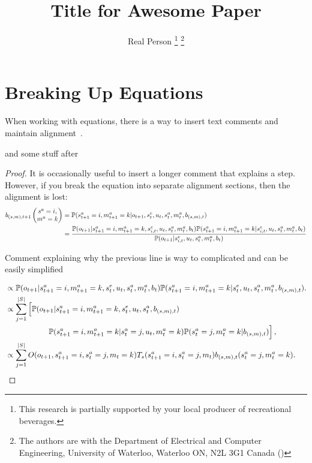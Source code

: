 \documentclass{article}
\title{\LARGE \bf
Title for Awesome Paper}
\author{Real Person
\thanks{This research is partially supported by your local producer of recreational beverages. }
\thanks{The authors are with the Department of Electrical and Computer Engineering, University of Waterloo, Waterloo ON, N2L 3G1 Canada (\real)
    }
}
\begin{document}
\newpage

\section{Breaking Up Equations}

When working with equations, there is a way to insert text comments and maintain alignment~\cite{wang2023cooperative}. 

and some stuff after

\begin{proof}

It is occasionally useful to insert a longer comment that explains a step.  However, if you break the equation into separate alignment sections, then the alignment is lost:
 \begin{align}
    b_{(s,m),t+1}\left(\begin{matrix}
        s^a = i, \\ m^a = k
    \end{matrix} \right) &= \mathbb{P}( s_{t+1}^a = i, m_{t+1}^a = k | o_{t+1}, s_{t}^e, u_{t}, s_t^a, m_t^a, b_{(s,m),t} ) \\
    &= \frac{\mathbb{P}( o_{t+1} | s_{t+1}^a = i, m_{t+1}^a = k, s_{i,t}^e, u_{t},  s_t^a, m_t^a, b_{t} ) \mathbb{P}( s_{t+1}^a = i, m_{t+1}^a = k |  s_{i,t}^e, u_{t},  s_t^a, m_t^a, b_{t} )}{\mathbb{P}(o_{t+1} | s_{i,t}^e, u_{t}, s_t^a, m_t^a, b_{t}   ) }     
 \end{align}

Comment explaining why the previous line is way to complicated and can be easily simplified

\begin{align}
     &\propto \mathbb{P}( o_{t+1} |  s_{t+1}^a = i, m_{t+1}^a = k, s_t^e, u_{t}, s_t^a, m_t^a, b_{t} ) \mathbb{P}( s_{t+1}^a = i, m_{t+1}^a = k |  s_t^e, u_{t}, s_{t}^a, m_{t}^a, b_{(s,m),t} ).  \\
    &\propto \sum_{j=1}^{|S|} \left[ \mathbb{P}( o_{t+1} |  s_{t+1}^a = i, m_{t+1}^a = k, s_t^e, u_{t}, s_t^a, b_{(s,m),t} ) \right. \nonumber \\ 
    &~~~~~~~~~~~~~~~~\left. \mathbb{P}( s_{t+1}^a = i, m_{t+1}^a = k | s_{t}^a=j, u_{t}, m_t^a = k ) \mathbb{P}( s_{t}^a = j, m_{t}^a = k |  b_{(s,m),t} ) \right],   \\
    &\propto  \sum_{j=1}^{|S|} O(o_{t+1},s_{t+1}^a=i,s_t^a=j,m_t=k) T_s(s_{t+1}^a=i, s_{t}^a=j, m_t ) b_{(s,m),t}(s_t^a = j, m_{t}^a = k).
\end{align}



\end{proof}
\end{document}
